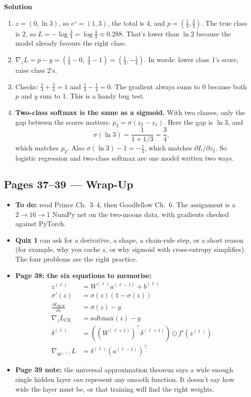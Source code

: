 \textbf{Solution}
\begin{enumerate}[leftmargin=*]
  \item $z = (0, \ln 3)$, so $e^{z} = (1, 3)$, the total is 4, and $p = (\tfrac14, \tfrac34)$. The true class is 2, so $L = -\log\tfrac34 = \log\tfrac43 \approx 0.288$. That's lower than $\ln 2$ because the model already favours the right class.
  \item $\nabla_z L = p - y = (\tfrac14 - 0,\; \tfrac34 - 1) = (\tfrac14, -\tfrac14)$. In words: lower class 1's score, raise class 2's.
  \item Checks: $\tfrac14 + \tfrac34 = 1$ and $\tfrac14 - \tfrac14 = 0$. The gradient always sums to 0 because both $p$ and $y$ sum to 1. This is a handy bug test.
  \item \textbf{Two-class softmax is the same as a sigmoid.} With two classes, only the gap between the scores matters: $p_2 = \sigma(z_2 - z_1)$. Here the gap is $\ln 3$, and
  \[
  \sigma(\ln 3) = \frac{1}{1 + 1/3} = \frac34,
  \]
  which matches $p_2$. Also $\sigma(\ln 3) - 1 = -\tfrac14$, which matches $\partial L/\partial z_2$. So logistic regression and two-class softmax are one model written two ways.
\end{enumerate}

\subsection*{Pages 37--39 --- Wrap-Up}

\begin{itemize}[leftmargin=*]
  \item \textbf{To do:} read Prince Ch.\ 3--4, then Goodfellow Ch.\ 6. The assignment is a $2 \to 16 \to 1$ NumPy net on the two-moons data, with gradients checked against PyTorch.
  \item \textbf{Quiz 1} can ask for a derivative, a shape, a chain-rule step, or a short reason (for example, why you cache $z$, or why sigmoid with cross-entropy simplifies). The four problems are the right practice.
  \item \textbf{Page 38: the six equations to memorise:}
  \begin{align*}
    z^{(\ell)} &= W^{(\ell)} a^{(\ell-1)} + b^{(\ell)} \\
    \sigma'(z) &= \sigma(z)\left(1 - \sigma(z)\right) \\
    \frac{\partial L_{\text{BCE}}}{\partial z} &= \sigma(z) - y \\
    \nabla_z L_{\text{CE}} &= \mathrm{softmax}(z) - y \\
    \delta^{(\ell)} &= \left( \left(W^{(\ell+1)}\right)^{\top} \delta^{(\ell+1)} \right) \odot f'(z^{(\ell)}) \\
    \nabla_{W^{(\ell)}} L &= \delta^{(\ell)} \left(a^{(\ell-1)}\right)^{\top}
  \end{align*}
  \item \textbf{Page 39 note:} the universal approximation theorem says a wide enough single hidden layer \emph{can} represent any smooth function. It doesn't say how wide the layer must be, or that training will find the right weights.
\end{itemize}